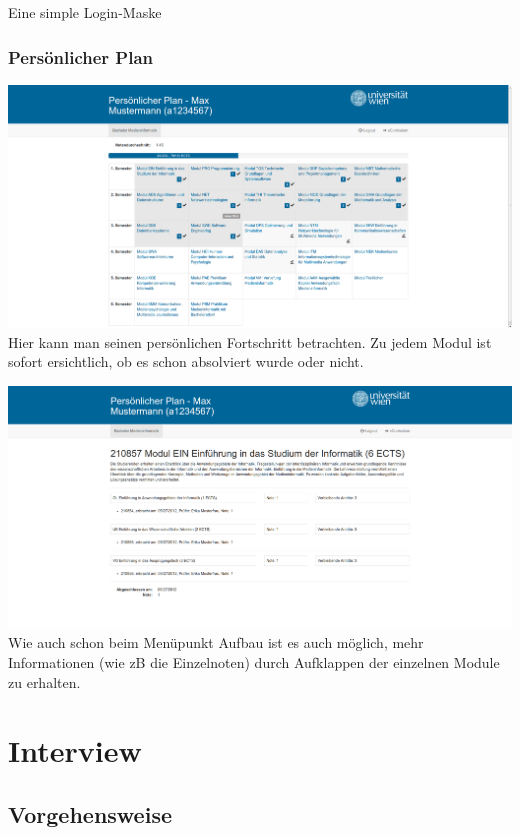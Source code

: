 \documentclass[a4paper,10pt]{scrartcl}
\begin{document}
Eine simple Login-Maske

\subsubsection*{Persönlicher Plan}

\includegraphics[scale=0.19]{./hifi_screenshots/hifi_persplan.png}\\

Hier kann man seinen persönlichen Fortschritt betrachten. Zu jedem Modul ist sofort ersichtlich, ob es schon absolviert wurde oder nicht.

\includegraphics[scale=0.19]{./hifi_screenshots/hifi_persplan2.png}\\

Wie auch schon beim Menüpunkt Aufbau ist es auch möglich, mehr Informationen (wie zB die Einzelnoten) durch Aufklappen der einzelnen Module zu erhalten.

\section*{Interview}

\subsection*{Vorgehensweise}
\end{document}
